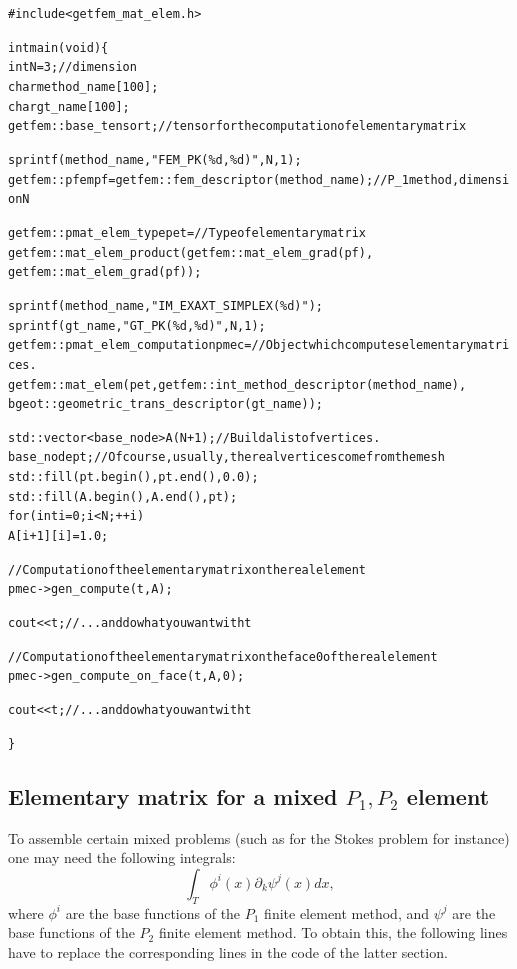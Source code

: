 \documentclass[11pt,a4paper]{article}
\begin{document}
\begin{alltt}
#include<getfem_mat_elem.h>

int main(void) \{
  int N = 3;                // dimension
  char method\_name[100];
  char gt\_name[100];
  getfem::base_tensor t;    // tensor for the computation of elementary matrix

  sprintf(method\_name, "FEM\_PK(\%d, \%d)", N, 1);
  getfem::pfem pf = getfem::fem\_descriptor(method\_name); // P_1 method, dimension N

  getfem::pmat_elem_type pet = // Type of elementary matrix
     getfem::mat_elem_product(getfem::mat_elem_grad(pf),
                              getfem::mat_elem_grad(pf));

  sprintf(method\_name, "IM\_EXAXT\_SIMPLEX(\%d)");
  sprintf(gt\_name, "GT\_PK(\%d, \%d)", N, 1);
  getfem::pmat_elem_computation pmec = // Object which computes elementary matrices.
     getfem::mat_elem(pet, getfem::int\_method\_descriptor(method\_name),
                           bgeot::geometric\_trans\_descriptor(gt\_name));

  std::vector<base_node> A(N+1);  // Build a list of vertices.
  base_node pt;  // Of course, usually, the real vertices come from the mesh
  std::fill(pt.begin(), pt.end(), 0.0);
  std::fill(A.begin(), A.end(), pt);
  for (int i = 0; i < N; ++i)
    A[i+1][i] = 1.0;

  // Computation of the elementary matrix on the real element
  pmec->gen_compute(t, A);

  cout << t; // ... and do what you want with t  

  // Computation of the elementary matrix on the face 0 of the real element
  pmec->gen_compute_on_face(t, A, 0); 

  cout << t; // ... and do what you want with t  

\}

\end{alltt}

\subsection{Elementary matrix for a mixed $P_1, P_2$ element}

To assemble certain mixed problems (such as for the Stokes problem for instance) one may need the following integrals:
$$ \int_T \phi^i(x) \partial_k \psi^j(x) dx, $$
where $\phi^i$ are the base functions of the $P_1$ finite element method, and $\psi^j$ are the base functions of the $P_2$ finite element method. To obtain this, the following lines have to replace the corresponding lines in the code of the latter section.
\end{document}
